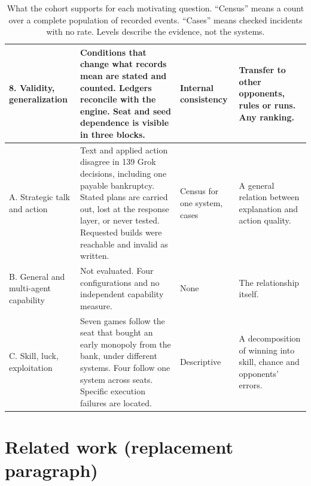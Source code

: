 \begin{table}[p]
\begin{tabularx}{\linewidth}{@{}L{2.5cm}YL{1.7cm}L{3.6cm}@{}}
8. Validity, generalization & Conditions that change what records mean are stated and counted. Ledgers reconcile with the engine. Seat and seed dependence is visible in three blocks. & Internal consistency & Transfer to other opponents, rules or runs. Any ranking.\\
\midrule
A. Strategic talk and action & Text and applied action disagree in 139 Grok decisions, including one payable bankruptcy. Stated plans are carried out, lost at the response layer, or never tested. Requested builds were reachable and invalid as written. & Census for one system, cases & A general relation between explanation and action quality.\\
B. General and multi-agent capability & Not evaluated. Four configurations and no independent capability measure. & None & The relationship itself.\\
C. Skill, luck, exploitation & Seven games follow the seat that bought an early monopoly from the bank, under different systems. Four follow one system across seats. Specific execution failures are located. & Descriptive & A decomposition of winning into skill, chance and opponents' errors.\\
\bottomrule
\end{tabularx}
\caption{What the cohort supports for each motivating question. ``Census'' means a count over a complete population of recorded events. ``Cases'' means checked incidents with no rate. Levels describe the evidence, not the systems.}
\label{tab:coverage}
\end{table}

\section{Related work (replacement paragraph)}

